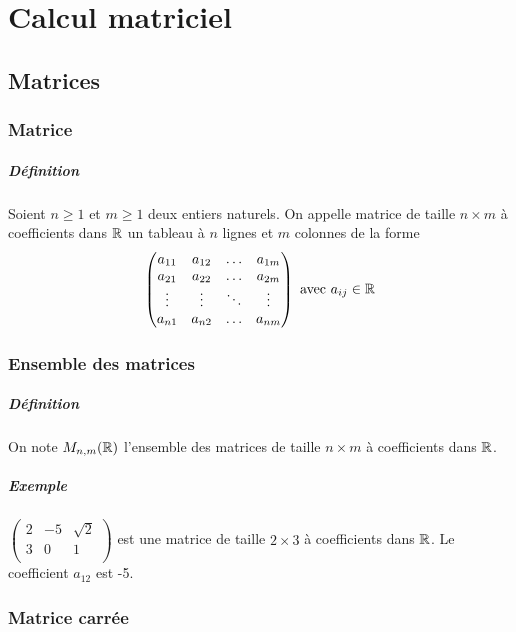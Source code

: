 \chapter{Calcul matriciel}

%
%
\section{Matrices}
%
%

%
\subsection{Matrice}
%
\paragraph{Définition} Soient $n \geq 1$ et $m \geq 1$ deux entiers naturels. On appelle matrice de taille $n\times m$ à coefficients dans $\mathbb{R}$ un tableau à $n$ lignes et $m$ colonnes de la forme
$$\begin{pmatrix}
  a_{11} & a_{12} & \ldots & a_{1m} \\
  a_{21} & a_{22} & \ldots & a_{2m} \\
  \vdots & \vdots & \ddots & \vdots \\
  a_{n1} & a_{n2} & \ldots & a_{nm}
\end{pmatrix} \text{ avec } a_{ij} \in \mathbb{R}$$

%
\subsection{Ensemble des matrices}
%
\paragraph{Définition} On note $M_{n, m}(\mathbb{R})$ l'ensemble des matrices de taille $n\times m$ à coefficients dans $\mathbb{R}$.

\paragraph{Exemple}
$\begin{pmatrix}
  2 & -5 & \sqrt{2} \\
 3 &0 & 1 \\
\end{pmatrix}$ est une matrice de taille $2\times 3$ à coefficients dans $\mathbb{R}$. Le coefficient $a_{12}$ est -5.

%
\subsection{Matrice carrée}
%
